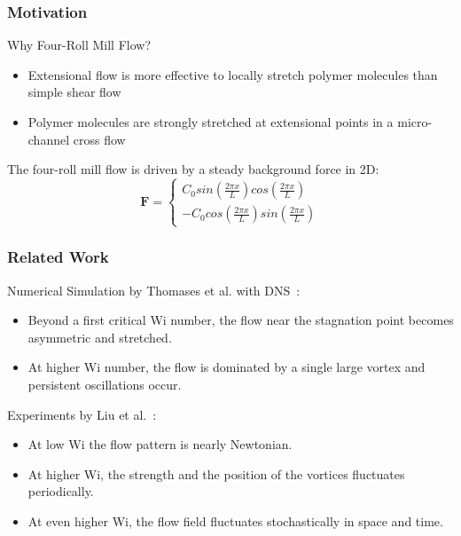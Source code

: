\begin{frame}
  \frametitle{Motivation}
  \begin{block}{Why Four-Roll Mill Flow?}
    \begin{itemize}
    \item Extensional flow is more effective to locally 
      stretch polymer molecules than simple shear flow
    \item Polymer molecules are strongly stretched at extensional points in a micro-channel cross flow
    \end{itemize}
  \end{block}
  The four-roll mill flow is driven by a steady background force in 2D:
  \begin{equation}
    \mathbf{F}=\left\{\begin{matrix}
        C_0sin(\frac{2\pi x} {L})cos(\frac{2\pi x} {L})
        \\ 
        -C_0cos(\frac{2\pi x} {L})sin(\frac{2\pi x} {L})
      \end{matrix}\right.
  \end{equation}
\end{frame}
\begin{frame}
  \frametitle{Related Work}
  \begin{block}{Numerical Simulation by Thomases et al. with DNS~\footnotemark: }
    \begin{itemize}
    \item Beyond a first critical Wi number, the flow near the stagnation point becomes asymmetric and stretched.
    \item At higher Wi number, the flow is dominated by a single large vortex and persistent oscillations occur. 
    \end{itemize}
  \end{block}
  \begin{block}{Experiments by Liu et al.~\footnotemark[2]:}
    \begin{itemize}
    \item  At low Wi the flow pattern is nearly Newtonian. 
    \item At higher Wi, the strength and the position of the vortices fluctuates periodically.
    \item At even higher Wi, the flow field fluctuates stochastically in space and time.
    \end{itemize}
  \end{block}
\end{frame}




